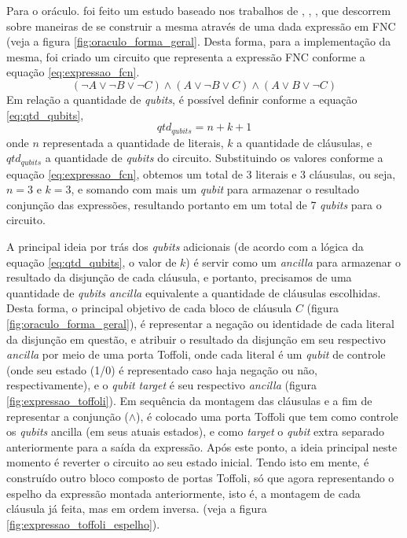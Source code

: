 \documentclass[12pt]{article}
\begin{document}
Para o oráculo. foi feito um estudo baseado nos trabalhos de \cite{fernandes2:19}, \cite{fernandes:19}, \cite{parallelAndDistributed}, que descorrem sobre maneiras de se construir a mesma através de uma dada expressão em FNC (veja a figura \ref{fig:oraculo_forma_geral}. Desta forma, para a implementação da mesma, foi criado um circuito que representa a expressão FNC conforme a equação \ref{eq:expressao_fcn}.
\begin{equation}
(\neg A \lor \neg B \lor \neg C) \land (A \lor \neg B \lor C) \land (A \lor B \lor \neg C)\label{eq:expressao_fcn}
\end{equation}
Em relação a quantidade de \textit{qubits}, é possível definir conforme a equação \ref{eq:qtd_qubits}, 
\begin{equation}
qtd_{\textit{qubits}} = n + k + 1\label{eq:qtd_qubits}
\end{equation}
onde $n$ representada a quantidade de literais, $k$ a quantidade de cláusulas, e $qtd_{\textit{qubits}}$ a quantidade de \textit{qubits} do circuito. Substituindo os valores conforme a equação \ref{eq:expressao_fcn}, obtemos um total de 3 literais e 3 cláusulas, ou seja, $n = 3$ e $k = 3$, e somando com mais um \textit{qubit} para armazenar o resultado conjunção das expressões, resultando portanto em um total de 7 \textit{qubits} para o circuito.

A principal ideia por trás dos \textit{qubits} adicionais (de acordo com a lógica da equação \ref{eq:qtd_qubits}, o valor de $k$) é servir como um \textit{ancilla} para armazenar o resultado da disjunção de cada cláusula, e portanto, precisamos de uma quantidade de \textit{qubits ancilla} equivalente a quantidade de cláusulas escolhidas. Desta forma, o principal objetivo de cada bloco de cláusula $C$ (figura \ref{fig:oraculo_forma_geral}), é representar a negação ou identidade de cada literal da disjunção em questão, e atribuir o resultado da disjunção em seu respectivo \textit{ancilla} por meio de uma porta Toffoli, onde cada literal é um \textit{qubit} de controle (onde seu estado (1/0) é representado caso haja negação ou não, respectivamente), e o \textit{qubit target} é seu respectivo \textit{ancilla}  (figura \ref{fig:expressao_toffoli}). Em sequência da montagem das cláusulas e a fim de representar a conjunção ($\land$), é colocado uma porta Toffoli que tem como controle os \textit{qubits} ancilla (em seus atuais estados), e como \textit{target} o \textit{qubit} extra separado anteriormente para a saída da expressão. 
Após este ponto, a ideia principal neste momento é reverter o circuito ao seu estado inicial. Tendo isto em mente, é construído outro bloco composto de portas Toffoli, só que agora representando o espelho da expressão montada anteriormente, isto é, a montagem de cada cláusula já feita, mas em ordem inversa. (veja a figura \ref{fig:expressao_toffoli_espelho}).
\end{document}
